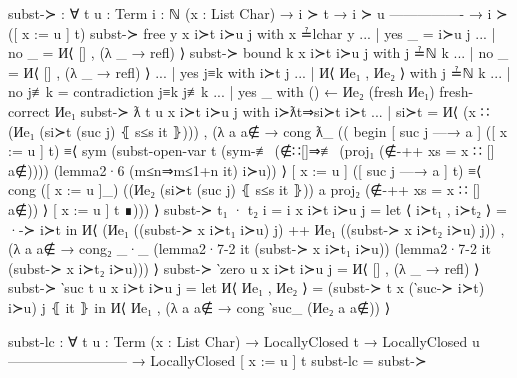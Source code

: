 \documentclass[logo,bsc,singlespacing,parskip,online]{infthesis}
\renewenvironment{code}{\mintedcopy[breaklines,breaksymbolleft=\;]{agda}}{\endmintedcopy}
\begin{document}
\begin{code}
subst-≻ : ∀ {t u : Term} {i : ℕ} (x : List Char)
  → i ≻ t
  → i ≻ u
    ----------------
  → i ≻ ([ x := u ] t)
subst-≻ {free y} x i≻t i≻u j with x ≟lchar y
... | yes _ = i≻u j
... | no  _ = И⟨ [] , (λ _ → refl) ⟩
subst-≻ {bound k} x i≻t i≻u j with j ≟ℕ k
... | no  _   = И⟨ [] , (λ _ → refl) ⟩
... | yes j≡k with i≻t j
...   | И⟨ Иe₁ , Иe₂ ⟩ with j ≟ℕ k
...     | no  j≢k = contradiction j≡k j≢k
...     | yes _   with () ← Иe₂ (fresh Иe₁) {fresh-correct Иe₁}
subst-≻ {ƛ t} {u} x i≻t i≻u j with i≻ƛt⇒si≻t i≻t
... | si≻t =
  И⟨ (x ∷ (Иe₁ (si≻t (suc j) ⦃ s≤s it ⦄)))
  , (λ a {a∉} → cong ƛ_ ((
    begin
      [ suc j —→ a ] ([ x := u ] t)
    ≡⟨ sym (subst-open-var
          t
          (sym-≢ (∉∷[]⇒≢ (proj₁ (∉-++ {xs = x ∷ []} a∉))))
          (lemma2·6 (m≤n⇒m≤1+n it) i≻u)) ⟩
      [ x := u ] ([ suc j —→ a ] t)
    ≡⟨ cong ([ x := u ]_)
        ((Иe₂ (si≻t (suc j) ⦃ s≤s it ⦄))
          a
          {proj₂ (∉-++ {xs = x ∷ []} a∉)}) ⟩
      [ x := u ] t
    ∎))) ⟩
subst-≻ {t₁ · t₂} {i = i} x i≻t i≻u j =
  let ⟨ i≻t₁ , i≻t₂ ⟩ = ·-≻ i≻t in
    И⟨ (Иe₁ ((subst-≻ x i≻t₁ i≻u) j)
      ++ Иe₁ ((subst-≻ x i≻t₂ i≻u) j))
    , (λ a {a∉} → cong₂ _·_
        (lemma2·7-2 it (subst-≻ x i≻t₁ i≻u))
        (lemma2·7-2 it (subst-≻ x i≻t₂ i≻u))) ⟩
subst-≻ {‵zero} {u} x i≻t i≻u j = И⟨ [] , (λ _ → refl) ⟩
subst-≻ {‵suc t} {u} x i≻t i≻u j =
  let И⟨ Иe₁ , Иe₂ ⟩ = (subst-≻ {t} x (‵suc-≻ i≻t) i≻u) j ⦃ it ⦄
    in И⟨ Иe₁ , (λ a {a∉} → cong ‵suc_ (Иe₂ a {a∉})) ⟩

subst-lc : ∀ {t u : Term} (x : List Char)
  → LocallyClosed t
  → LocallyClosed u
    --------------------------
  → LocallyClosed [ x := u ] t
subst-lc = subst-≻
\end{code}
\end{document}
